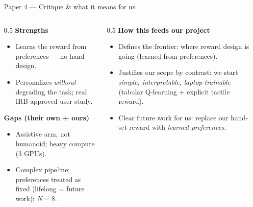 \documentclass[aspectratio=169,10pt]{beamer}
\begin{document}
\begin{frame}{Paper 4 --- Critique \& what it means for us}
  \begin{columns}[T]
    \begin{column}{0.5\textwidth}
      \textbf{Strengths}
      \begin{itemize}\footnotesize
        \item \alert{Learns} the reward from preferences --- no hand-design.
        \item Personalizes \emph{without} degrading the task; real IRB-approved user study.
      \end{itemize}
      \textbf{Gaps (their own + ours)}
      \begin{itemize}\footnotesize
        \item Assistive arm, not humanoid; \alert{heavy compute} (3 GPUs).
        \item Complex pipeline; preferences treated as fixed (lifelong = future work); $N=8$.
      \end{itemize}
    \end{column}
    \begin{column}{0.5\textwidth}
      \textbf{How this feeds our project}
      \begin{itemize}\footnotesize
        \item Defines the \alert{frontier}: where reward design is going (learned from preferences).
        \item Justifies our scope by contrast: we start \emph{simple, interpretable, laptop-trainable} (tabular Q-learning + explicit tactile reward).
        \item Clear \alert{future work} for us: replace our hand-set reward with \emph{learned preferences}.
      \end{itemize}
    \end{column}
  \end{columns}
\end{frame}
\end{document}
